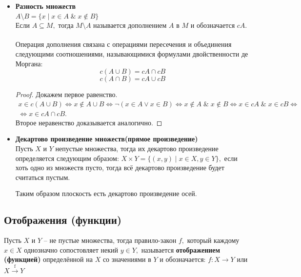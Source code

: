 \begin{itemize}
\item {\bf Разность множеств}
\\$A\setminus B = \{x\mid x\in A \;\&\; x\notin B\}$
\\Если $A\subseteq M,$ тогда $M\setminus A$ называется дополнением $A$ в $M$ и обозначается $cA.$\\
\\Операция дополнения связана с операциями пересечения и объединения следующими соотношениями, называющимися формулами двойственности де Моргана: 
$$c\left(A\cup B\right)=cA\cap cB$$
$$c\left(A\cap B\right)=cA\cup cB$$

\begin{proof}
Докажем первое равенство. 
\begin{eqnarray}
x\in c\left(A\cup B\right) \Leftrightarrow x\notin A\cup B \Leftrightarrow \neg\left(x\in A \vee x\in B\right) \Leftrightarrow x\notin A \;\&\; x\notin B \Leftrightarrow x\in cA \;\&\; x\in cB \Leftrightarrow \nonumber \\ 
\Leftrightarrow x\in cA\cap cB.\nonumber
\end{eqnarray}
Второе неравенство доказывается аналогично.
\end{proof}

\item {\bf Декартово произведение множеств(прямое произведение)}
\\Пусть $X$ и $Y$ непустые множества, тогда их декартово произведение определяется следующим образом: $X\times Y = \{(x,y)\mid x\in X, y\in Y\},$ если хоть одно из множеств пусто, тогда всё декартово произведение будет считаться пустым.

\begin{Remark}
Таким образом плоскость есть декартово произведение осей.
\end{Remark}
\end{itemize}

\subsection{Отображения (функции)}

\begin{Definition}
Пусть $X$ и $Y$ -- не пустые множества, тогда правило-закон $f,$ который каждому $x\in X$ однозначно сопостовляет некий $y\in Y,$ называется {\bf отображением (функцией)} определённой на $X$ со значениями в $Y$ и обозначается: $f:X \rightarrow Y$ или $X \xrightarrow{\text{f}}Y$
\end{Definition}

